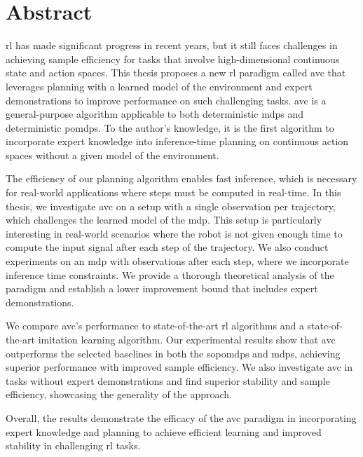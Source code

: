 \clearemptydoublepage
{}
{}

\chapter*{Abstract}
\label{chapter:Abstract}

\ac{rl} has made significant progress in recent years, but it still faces challenges in achieving sample efficiency for tasks that involve high-dimensional continuous state and action spaces. 
This thesis proposes a new \ac{rl} paradigm called \ac{avc} that leverages planning with a learned model of the environment and expert demonstrations to improve performance on such challenging tasks. 
\ac{avc} is a general-purpose algorithm applicable to both deterministic \ac{mdp}s and deterministic \ac{pomdp}s. To the author's knowledge, it is the first algorithm to incorporate expert knowledge 
into inference-time planning on continuous action spaces without a given model of the environment.

The efficiency of our planning algorithm enables fast inference, which is necessary for real-world applications where steps must be computed in real-time. In this thesis, we investigate 
\ac{avc} on a setup with a single observation per trajectory, which challenges the learned model of the \ac{mdp}. This setup is particularly interesting in real-world scenarios where the 
robot is not given enough time to compute the input signal after each step of the trajectory. We also conduct experiments on an \ac{mdp} with observations after each step, where we incorporate 
inference time constraints. We provide a thorough theoretical analysis of the paradigm and establish a lower improvement bound that includes expert demonstrations.

We compare \ac{avc}'s performance to state-of-the-art \ac{rl} algorithms and a state-of-the-art imitation learning algorithm. Our experimental results show that \ac{avc} outperforms the selected 
baselines in both the \ac{sopomdp}s and \ac{mdp}s, achieving superior performance with improved sample efficiency. We also investigate \ac{avc} in tasks without expert demonstrations and 
find superior stability and sample efficiency, showcasing the generality of the approach.

Overall, the results demonstrate the efficacy of the \ac{avc} paradigm in incorporating expert knowledge and planning to achieve efficient learning and improved stability in challenging \ac{rl} tasks.
